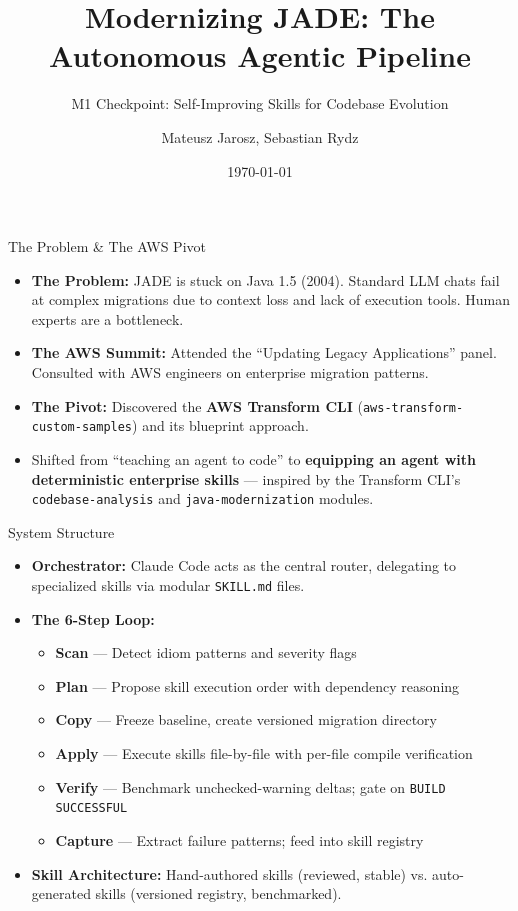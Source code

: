 \documentclass[aspectratio=169]{beamer}
\title{Modernizing JADE: The Autonomous Agentic Pipeline}
\subtitle{M1 Checkpoint: Self-Improving Skills for Codebase Evolution}
\author{Mateusz Jarosz, Sebastian Rydz}
\institute{Warsaw University of Technology}
\date{\today}
\begin{document}
\begin{frame}
  \titlepage
\end{frame}

\begin{frame}{The Problem \& The AWS Pivot}
\begin{itemize}
  \item \textbf{The Problem:} JADE is stuck on Java 1.5 (2004). Standard LLM chats fail at complex migrations due to context loss and lack of execution tools. Human experts are a bottleneck.
  \item \textbf{The AWS Summit:} Attended the ``Updating Legacy Applications'' panel. Consulted with AWS engineers on enterprise migration patterns.
  \item \textbf{The Pivot:} Discovered the \textbf{AWS Transform CLI} (\texttt{aws-transform-custom-samples}) and its blueprint approach.
  \item Shifted from ``teaching an agent to code'' to \textbf{equipping an agent with deterministic enterprise skills} --- inspired by the Transform CLI's \texttt{codebase-analysis} and \texttt{java-modernization} modules.
\end{itemize}
\end{frame}

\begin{frame}{System Structure}
\begin{itemize}
  \item \textbf{Orchestrator:} Claude Code acts as the central router, delegating to specialized skills via modular \texttt{SKILL.md} files.
  \item \textbf{The 6-Step Loop:}
  \begin{itemize}
    \item \textbf{Scan} --- Detect idiom patterns and severity flags
    \item \textbf{Plan} --- Propose skill execution order with dependency reasoning
    \item \textbf{Copy} --- Freeze baseline, create versioned migration directory
    \item \textbf{Apply} --- Execute skills file-by-file with per-file compile verification
    \item \textbf{Verify} --- Benchmark unchecked-warning deltas; gate on \texttt{BUILD SUCCESSFUL}
    \item \textbf{Capture} --- Extract failure patterns; feed into skill registry
  \end{itemize}
  \item \textbf{Skill Architecture:} Hand-authored skills (reviewed, stable) vs. auto-generated skills (versioned registry, benchmarked).
\end{itemize}
\end{frame}
\end{document}
